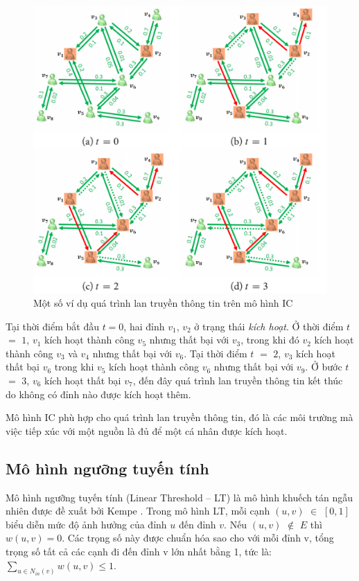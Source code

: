		\begin{center}
			\begin{figure}[H]
				\begin{center}
					\includegraphics [scale=1]{picture/Hinh2_1}
				\end{center}
				\caption{Một số ví dụ quá trình lan truyền thông tin trên mô hình IC}
				\label{refhinh2_1}
			\end{figure}
		\end{center}
	Tại thời điểm bắt đầu $t=0$, hai đỉnh $v$$_{1}$, $v$$_{2}$ ở trạng thái {\itshape kích hoạt}. Ở thời điểm $t$ $=$ $1$, $v$$_{1}$ kích hoạt thành công $v$$_{5}$ nhưng thất bại với $v$$_{3}$, trong khi đó $v$$_{2}$ kích hoạt thành công $v$$_{3}$ và $v$$_{4}$ nhưng thất bại với $v$$_{6}$. Tại thời điểm $t$ $=$ $2$, $v$$_{3}$ kích hoạt thất bại $v$$_{6}$ trong khi $v$$_{5}$ kích hoạt thành công $v$$_{6}$ nhưng thất bại với $v$$_{9}$. Ở bước $t$ $=$ $3$, $v$$_{6}$ kích hoạt thất bại $v$$_{7}$, đến đây quá trình lan truyền thông tin kết thúc do không có đỉnh nào được kích hoạt thêm.
	
	Mô hình IC phù hợp cho quá trình lan truyền thông tin, đó là các môi trường mà việc tiếp xúc với một nguồn là đủ để một cá nhân được kích hoạt.
	
	\subsection{Mô hình ngưỡng tuyến tính}
	Mô hình ngưỡng tuyến tính (Linear Threshold – LT) là mô hình khuếch tán ngẫu nhiên được đề xuất bởi Kempe \cite{kemple1}. Trong mô hình LT, mỗi cạnh $(u,v)$ $\in$ $[0,1]$ biểu diễn mức độ ảnh hưởng của đỉnh $u$ đến đỉnh $v$. Nếu $(u,v)$ $\notin$ $E$ thì $w(u,v)=0$. Các trọng số này được chuẩn hóa sao cho với mỗi đỉnh v, tổng trọng số tất cả các cạnh đi đến đỉnh v lớn nhất bằng 1, tức là: $\sum_{u\in N_{in}(v)}w(u,v) \leq 1.$ 
	
